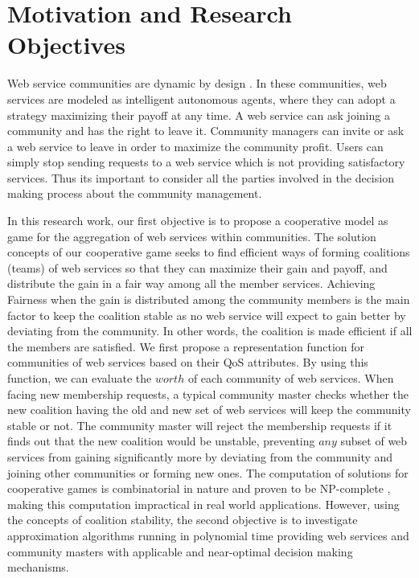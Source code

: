 \section{Motivation and Research Objectives}\label{sec:motexample}

Web service communities are dynamic by design
\cite{DBLP:journals/ijebr/MaamarSTBB09}. In these communities, web
services are modeled as intelligent autonomous agents, where they
can adopt a strategy maximizing their payoff at any time. A web
service can ask joining a community and has the right to leave it.
Community managers can invite or ask a web service to leave in
order to maximize the community profit. Users can simply stop
sending requests to a web service which is not providing
satisfactory services. Thus its important to consider all the
parties involved in the decision making process about the
community management.

In this research work, our first objective is to propose a
cooperative model as game for the aggregation of web services
within communities. The solution concepts of our cooperative game
seeks to find efficient ways of forming coalitions (teams) of web
services so that they can maximize their gain and payoff, and
distribute the gain in a fair way among all the member services.
Achieving Fairness when the gain is distributed among the
community members is the main factor to keep the coalition stable
as no web service will expect to gain better by deviating from the
community. In other words, the coalition is made efficient if all
the members are satisfied. We first propose a representation
function for communities of web services based on their QoS
attributes. By using this function, we can evaluate the $worth$ of
each community of web services. When facing new membership
requests, a typical community master checks whether the new
coalition having the old and new set of web services will keep the
community stable or not. The community master will reject the
membership requests if it finds out that the new coalition would
be unstable, preventing $any$ subset of web services from gaining
significantly more by deviating from the community and joining
other communities or forming new ones. The computation of
solutions for cooperative games is combinatorial in nature and
proven to be NP-complete \cite{Algorithmic}, making this
computation impractical in real world applications. However, using
the concepts of coalition stability, the second objective is to
investigate approximation algorithms running in polynomial time
providing web services and community masters with applicable and
near-optimal decision making mechanisms. 

